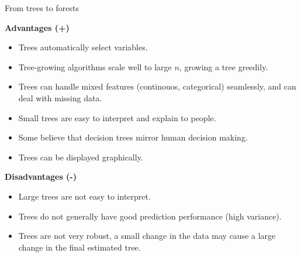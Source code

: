 \documentclass[10pt,ignorenonframetext,]{beamer}
\providecommand{\tightlist}{%
  \setlength{\itemsep}{0pt}\setlength{\parskip}{0pt}}
\begin{document}
\begin{frame}{From trees to forests}
\protect\hypertarget{from-trees-to-forests}{}

\textbf{Advantages (+)}

\begin{itemize}
\tightlist
\item
  Trees automatically select variables.
\item
  Tree-growing algorithms scale well to large \(n\), growing a tree
  greedily.
\item
  Trees can handle mixed features (continouos, categorical) seamlessly,
  and can deal with missing data.
\item
  Small trees are easy to interpret and explain to people.
\item
  Some believe that decision trees mirror human decision making.
\item
  Trees can be displayed graphically.
\end{itemize}

\textbf{Disadvantages (-)}

\begin{itemize}
\tightlist
\item
  Large trees are not easy to interpret.
\item
  Trees do not generally have good prediction performance (high
  variance).
\item
  Trees are not very robust, a small change in the data may cause a
  large change in the final estimated tree.
\end{itemize}

\end{frame}
\end{document}
